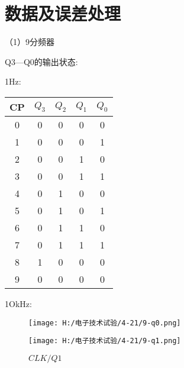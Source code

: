 \documentclass{article}
\begin{document}
\section{ 数据及误差处理}
（1）9分频器\par
Q3—Q0的输出状态:  \par
1Hz:\par
\begin{table}[h]
  \centering  
  \begin{tabular}{c|c|c|c|c}
      \hline
            CP             & $Q_3$  &$Q_2$  &$Q_1$  &$Q_0$  \\ \hline
            0              & 0      &0      & 0     & 0     \\ \hline
            1              & 0      &0      & 0     & 1            \\ \hline
            2              & 0      &0      & 1     & 0            \\ \hline
            3              & 0      &0      & 1     & 1            \\ \hline
            4              & 0      &1      & 0     & 0            \\ \hline
            5              & 0      &1      & 0     & 1           \\ \hline
            6              & 0      &1      & 1     & 0           \\ \hline
            7              & 0      &1      & 1     & 1           \\ \hline
            8              & 1      &0      & 0     & 0           \\ \hline
            9              & 0      &0      & 0     & 0           \\ \hline
          \end{tabular}
\end{table}
\par
\newpage
1OkHz:\par
\begin{figure}[h]
  \begin{minipage}[t]{0.5\linewidth} %
    \centering   
    \texttt{[image: H:/电子技术试验/4-21/9-q0.png]}   
    \caption{$CLK/Q0$}   
    \label{fig:side:a}   
  \end{minipage}%
  \begin{minipage}[t]{0.5\linewidth}   
    \centering   
    \texttt{[image: H:/电子技术试验/4-21/9-q1.png]}   
    \caption{$CLK/Q1$}   
    \label{fig:side:b}   
  \end{minipage}   
\end{figure}
\end{document}
